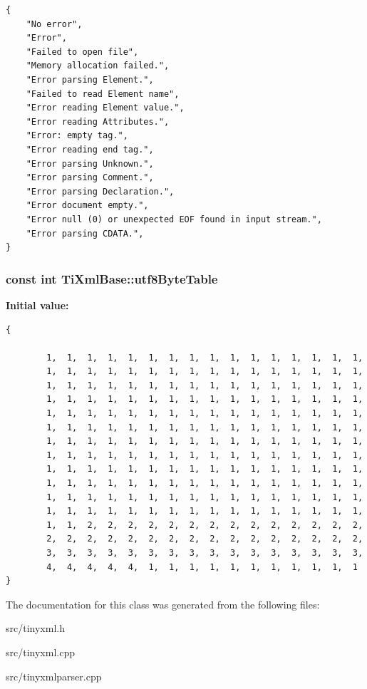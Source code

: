 \footnotesize\begin{verbatim}
{
    "No error",
    "Error",
    "Failed to open file",
    "Memory allocation failed.",
    "Error parsing Element.",
    "Failed to read Element name",
    "Error reading Element value.",
    "Error reading Attributes.",
    "Error: empty tag.",
    "Error reading end tag.",
    "Error parsing Unknown.",
    "Error parsing Comment.",
    "Error parsing Declaration.",
    "Error document empty.",
    "Error null (0) or unexpected EOF found in input stream.",
    "Error parsing CDATA.",
}
\end{verbatim}\normalsize 
{}
\subsubsection{\setlength{\rightskip}{0pt plus 5cm}const int Ti\-Xml\-Base::utf8Byte\-Table\hspace{0.3cm}{\tt  [static, inherited]}}\label{classTiXmlBase_TiXmlUnknowns0}


{\bf Initial value:}

\footnotesize\begin{verbatim} 
{
    
        1,  1,  1,  1,  1,  1,  1,  1,  1,  1,  1,  1,  1,  1,  1,  1,  
        1,  1,  1,  1,  1,  1,  1,  1,  1,  1,  1,  1,  1,  1,  1,  1,  
        1,  1,  1,  1,  1,  1,  1,  1,  1,  1,  1,  1,  1,  1,  1,  1,  
        1,  1,  1,  1,  1,  1,  1,  1,  1,  1,  1,  1,  1,  1,  1,  1,  
        1,  1,  1,  1,  1,  1,  1,  1,  1,  1,  1,  1,  1,  1,  1,  1,  
        1,  1,  1,  1,  1,  1,  1,  1,  1,  1,  1,  1,  1,  1,  1,  1,  
        1,  1,  1,  1,  1,  1,  1,  1,  1,  1,  1,  1,  1,  1,  1,  1,  
        1,  1,  1,  1,  1,  1,  1,  1,  1,  1,  1,  1,  1,  1,  1,  1,  
        1,  1,  1,  1,  1,  1,  1,  1,  1,  1,  1,  1,  1,  1,  1,  1,  
        1,  1,  1,  1,  1,  1,  1,  1,  1,  1,  1,  1,  1,  1,  1,  1,  
        1,  1,  1,  1,  1,  1,  1,  1,  1,  1,  1,  1,  1,  1,  1,  1,  
        1,  1,  1,  1,  1,  1,  1,  1,  1,  1,  1,  1,  1,  1,  1,  1,  
        1,  1,  2,  2,  2,  2,  2,  2,  2,  2,  2,  2,  2,  2,  2,  2,  
        2,  2,  2,  2,  2,  2,  2,  2,  2,  2,  2,  2,  2,  2,  2,  2,  
        3,  3,  3,  3,  3,  3,  3,  3,  3,  3,  3,  3,  3,  3,  3,  3,  
        4,  4,  4,  4,  4,  1,  1,  1,  1,  1,  1,  1,  1,  1,  1,  1   
}
\end{verbatim}\normalsize 


The documentation for this class was generated from the following files:\begin{CompactItemize}
\item 
src/tinyxml.h\item 
src/tinyxml.cpp\item 
src/tinyxmlparser.cpp\end{CompactItemize}
